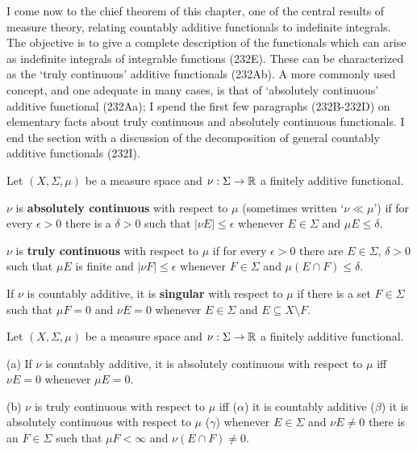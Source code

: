 
\def\chaptername{The Radon-Nikod\'ym theorem}
\def\sectionname{The Radon-Nikod\'ym theorem}


I come now to the chief theorem of this chapter, one of the central
results of measure theory, relating countably additive functionals to
indefinite integrals.   The objective is to give a complete description
of the functionals which can arise as indefinite integrals of integrable
functions (232E).   These can be characterized as the `truly continuous'
additive functionals (232Ab).   A more commonly used concept, and one
adequate in many cases, is that of `absolutely continuous' additive
functional (232Aa);  I spend the first few paragraphs (232B-232D) on
elementary facts about truly continuous and absolutely continuous
functionals.   I end the section with a discussion of the decomposition
of general countably additive functionals (232I).

 Let $(X,\Sigma,\mu)$ be
a measure space and $\nu:\Sigma\to\Bbb R$ a finitely additive
functional.

 $\nu$ is {\bf absolutely continuous} with
respect to $\mu$ (sometimes written `$\nu\ll\mu$') if
for every $\epsilon>0$ there is a $\delta>0$ such that
$|\nu E|\le\epsilon$ whenever  $E\in\Sigma$ and $\mu E\le\delta$.


 $\nu$ is {\bf truly continuous} with respect to
$\mu$ if for
every $\epsilon>0$ there are $E\in\Sigma$, $\delta>0$ such that
$\mu E$ is finite and $|\nu F|\le\epsilon$ whenever $F\in\Sigma$ and
$\mu(E\cap F)\le\delta$.


   If $\nu$ is countably additive, it is
{\bf singular} with respect to $\mu$
if there is a set $F\in\Sigma$ such that $\mu F=0$ and
$\nu E=0$ whenever $E\in\Sigma$ and $E\subseteq X\setminus F$.


 Let $(X,\Sigma,\mu)$ be a measure
space and $\nu:\Sigma\to\Bbb R$ a finitely additive functional.

(a) If $\nu$ is countably additive, it is absolutely continuous with
respect to $\mu$ iff $\nu E=0$
whenever $\mu E=0$.

(b) $\nu$ is truly continuous with respect to $\mu$ iff ($\alpha$) it is
countably additive ($\beta$) it is absolutely continuous with respect to
$\mu$ ($\gamma$) whenever $E\in\Sigma$ and $\nu E\ne 0$
there is an $F\in\Sigma$ such that $\mu F<\infty$ and
$\nu(E\cap F)\ne 0$.

